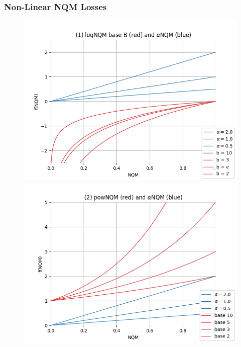 \subsubsection{Non-Linear NQM Losses}
\label{experiments:03.1.x:FurtherNQMLosses}
\begin{figure}[h!]
    \centering
        \begin{minipage}{0.49\textwidth}
        \centering
        \includegraphics[width=\linewidth]{Graphics/Experiments/3.1_alphas_logs.png}
    \end{minipage} \hfill
    \begin{minipage}{0.49\textwidth}
        \centering
        \includegraphics[width=\linewidth]{Graphics/Experiments/3.1_alphas_pow.png}

\end{minipage}
\end{figure}
